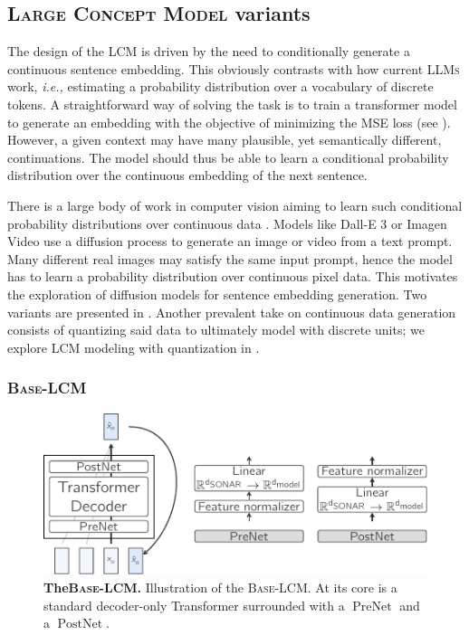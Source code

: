 \documentclass[twoside,11pt]{fairmeta}
\newcommand{\llms}{\textsc{LLMs}\xspace}
\newcommand{\lcm}{\textsc{LCM}\xspace}
\newcommand{\LCM}{\textsc{Large Concept Model}\xspace}
\newcommand{\mselcm}{\textsc{Base-LCM}\xspace}
\DeclareMathOperator{\postnet}{PostNet}
\DeclareMathOperator{\prenet}{PreNet}
\newcommand{\ie}{\textit{i.e.,}\xspace}
\begin{document}
\subsection{\LCM variants}
\label{sec:archi:lcm}
The design of the \lcm is driven by the need to conditionally generate a continuous sentence embedding. 
This obviously contrasts with how current \llms work, \ie estimating a probability distribution over a vocabulary of discrete tokens.
A straightforward way of solving the task is to train a transformer model to generate an embedding with the objective of minimizing the MSE loss (see ). 
However, a given context may have many plausible, yet semantically different, continuations.
The model should thus be able to learn a conditional probability distribution over the continuous embedding of the next sentence.

There is a large body of work in computer vision aiming to learn such conditional probability distributions over continuous data \citep{dhariwal2021diffusion,rombach_image_diffusion}. 
Models like Dall-E 3 \citep{dalle3} or Imagen Video \citep{ho2022imagenvideo} use a diffusion process to generate an image or video from a text prompt. 
Many different real images may satisfy the same input prompt, hence the model has to learn a probability distribution over continuous pixel data.
This motivates the exploration of diffusion models for sentence embedding generation.
Two variants are presented in .
Another prevalent take on continuous data generation consists of quantizing said data to ultimately model with discrete units; we explore \lcm modeling with quantization in .


\subsubsection{\mselcm}
\label{sec:arch:base}
\begin{figure}[!t]
    \centering
    \includegraphics[width=.8\linewidth]{mse_lcm.pdf}
    \caption{\textbf{The\mselcm.} Illustration of the \mselcm. At its core is a standard decoder-only Transformer surrounded with a $\prenet$ and a $\postnet$.}
    \label{fig:archi:baselcm}
\end{figure}
\end{document}
